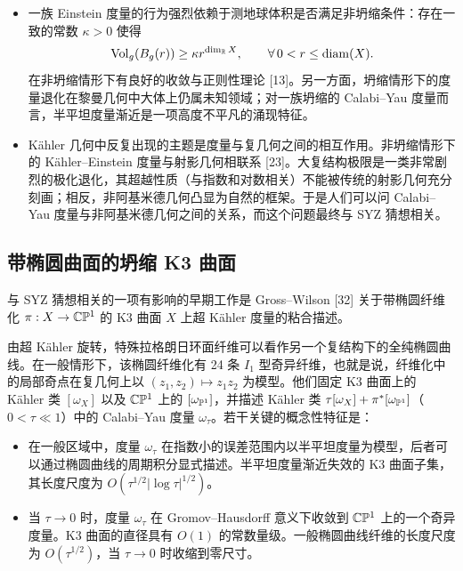 
\begin{itemize}
\item 一族 Einstein 度量的行为强烈依赖于测地球体积是否满足非坍缩条件：存在一致的常数 $\kappa>0$ 使得
\[
\mathrm{Vol}_g(B_g(r))\ge\kappa r^{\dim_{\mathbb{R}}X},\qquad \forall\, 0<r\le\mathrm{diam}(X).
\]
在非坍缩情形下有良好的收敛与正则性理论 [13]。另一方面，坍缩情形下的度量退化在黎曼几何中大体上仍属未知领域；对一族坍缩的 Calabi--Yau 度量而言，半平坦度量渐近是一项高度不平凡的涌现特征。
\item Kähler 几何中反复出现的主题是度量与复几何之间的相互作用。非坍缩情形下的 Kähler--Einstein 度量与射影几何相联系 [23]。大复结构极限是一类非常剧烈的极化退化，其超越性质（与指数和对数相关）不能被传统的射影几何充分刻画；相反，非阿基米德几何凸显为自然的框架。于是人们可以问 Calabi--Yau 度量与非阿基米德几何之间的关系，而这个问题最终与 SYZ 猜想相关。
\end{itemize}


\subsection{带椭圆曲面的坍缩 K3 曲面}

与 SYZ 猜想相关的一项有影响的早期工作是 Gross--Wilson [32] 关于带椭圆纤维化 $\pi:X\to\mathbb{C}\mathbb{P}^1$ 的 K3 曲面 $X$ 上超 Kähler 度量的粘合描述。

由超 Kähler 旋转，特殊拉格朗日环面纤维可以看作另一个复结构下的全纯椭圆曲线。在一般情形下，该椭圆纤维化有 24 条 $I_1$ 型奇异纤维，也就是说，纤维化中的局部奇点在复几何上以 $(z_1,z_2)\mapsto z_1z_2$ 为模型。他们固定 K3 曲面上的 Kähler 类 $[\omega_X]$ 以及 $\mathbb{C}\mathbb{P}^1$ 上的 $[\omega_{\mathbb{P}^1}]$，并描述 Kähler 类 $\tau[\omega_X]+\pi^*[\omega_{\mathbb{P}^1}]$（$0<\tau\ll1$）中的 Calabi--Yau 度量 $\omega_\tau$。若干关键的概念性特征是：

\begin{itemize}
\item 在一般区域中，度量 $\omega_\tau$ 在指数小的误差范围内以半平坦度量为模型，后者可以通过椭圆曲线的周期积分显式描述。半平坦度量渐近失效的 K3 曲面子集，其长度尺度为 $O(\tau^{1/2}|\log\tau|^{1/2})$。
\item 当 $\tau\to0$ 时，度量 $\omega_\tau$ 在 Gromov--Hausdorff 意义下收敛到 $\mathbb{C}\mathbb{P}^1$ 上的一个奇异度量。K3 曲面的直径具有 $O(1)$ 的常数量级。一般椭圆曲线纤维的长度尺度为 $O(\tau^{1/2})$，当 $\tau\to0$ 时收缩到零尺寸。
\end{itemize}

